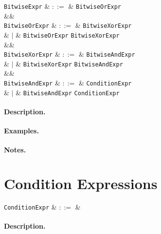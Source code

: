 \begin{syntax}
  \verb+BitwiseExpr+ & $::=$ & \verb+BitwiseOrExpr+ \\
  &&\\
  \verb+BitwiseOrExpr+ & $::=$ & \verb+BitwiseXorExpr+ \\
                           & $|$ & \verb+BitwiseOrExpr+ \token{|} \verb+BitwiseXorExpr+\\
  &&\\
  \verb+BitwiseXorExpr+ & $::=$ & \verb+BitwiseAndExpr+ \\
                            & $|$ & \verb+BitwiseXorExpr+ \token{\^} \verb+BitwiseAndExpr+\\
  &&\\
  \verb+BitwiseAndExpr+ & $::=$ & \verb+ConditionExpr+ \\
                            & $|$ & \verb+BitwiseAndExpr+ \token{\&\&} \verb+ConditionExpr+\\

\end{syntax}

\paragraph{Description.}

\paragraph{Examples.}

\paragraph{Notes.} 


\section{Condition Expressions}
\label{c_expr_condition}

\begin{syntax}
  \verb+ConditionExpr+ & $::=$ &\\
\end{syntax}

\paragraph{Description.}

